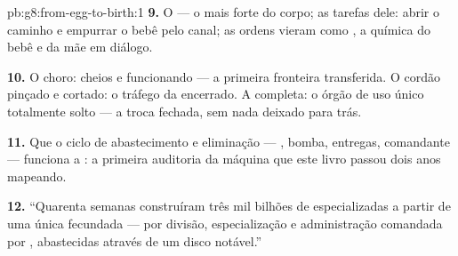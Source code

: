 \begin{solution}{pb:g8:from-egg-to-birth:1}
\textbf{9.} O  --- o  mais forte do corpo; as tarefas dele:
abrir o caminho e empurrar o bebê pelo canal; as ordens vieram como
, a química do bebê e da mãe em diálogo.

\textbf{10.} O choro:  cheios e funcionando --- a primeira
fronteira transferida. O cordão pinçado e cortado: o tráfego da
 encerrado. A  completa: o órgão de uso único
totalmente solto --- a troca fechada, sem nada deixado para trás.

\textbf{11.} Que o ciclo de abastecimento e eliminação --- ,
bomba, entregas, comandante --- funciona a : a primeira auditoria
da máquina que este livro passou dois anos mapeando.

\textbf{12.} ``Quarenta semanas construíram três mil bilhões de
 especializadas a partir de uma única  fecundada --- por divisão, especialização e administração
comandada por , abastecidas através de um disco notável.''
\end{solution}
